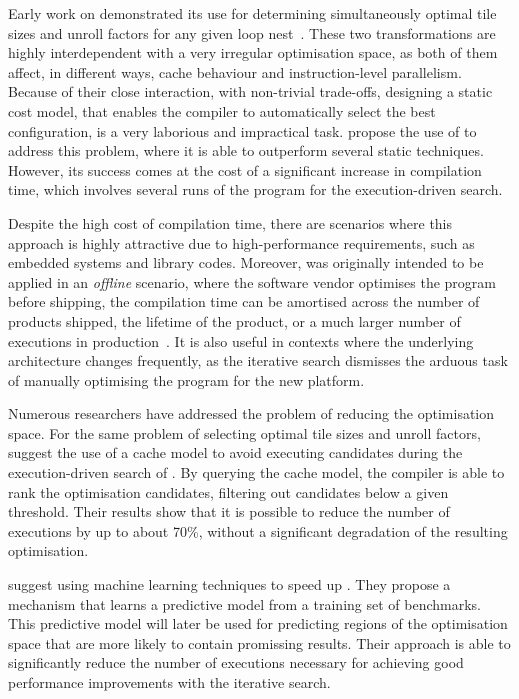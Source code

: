 Early work on {\itercomp} demonstrated its use for determining simultaneously optimal tile sizes and unroll factors for any given loop nest~\cite{kisuki00,knijnenburg04}.
These two transformations are highly interdependent with a very irregular optimisation space, as both of them affect, in different ways, cache behaviour and instruction-level parallelism.
Because of their close interaction, with non-trivial trade-offs, designing a static cost model, that enables the compiler to automatically select the best configuration, is a very laborious and impractical task.
\cite{kisuki00} propose the use of {\itercomp} to address this problem, where it is able to outperform several static techniques.
However, its success comes at the cost of a significant increase in compilation time, which involves several runs of the program for the execution-driven search.

Despite the high cost of compilation time, there are scenarios where this approach is highly attractive due to high-performance requirements, such as embedded systems and library codes.
Moreover, {\itercomp} was originally intended to be applied in an \textit{offline} scenario, where the software vendor optimises the program before shipping, the compilation time can be amortised across the number of products shipped, the lifetime of the product, or a much larger number of executions in production~\cite{kisuki99,kisuki00,chen10}.
It is also useful in contexts where the underlying architecture changes frequently, as the iterative search dismisses the arduous task of manually optimising the program for the new platform.

Numerous researchers have addressed the problem of reducing the optimisation space.
For the same problem of selecting optimal tile sizes and unroll factors, \cite{knijnenburg04} suggest the use of a cache model to avoid executing candidates during the execution-driven search of {\itercomp}.
By querying the cache model, the compiler is able to rank the optimisation candidates, filtering out candidates below a given threshold.
Their results show that it is possible to reduce the number of executions by up to about 70\%, without a significant degradation of the resulting optimisation.

\cite{agakov06} suggest using machine learning techniques to speed up {\itercomp}.
They propose a mechanism that learns a predictive model from a training set of benchmarks.
This predictive model will later be used for predicting regions of the optimisation space that are more likely to contain promissing results.
Their approach is able to significantly reduce the number of executions necessary for achieving good performance improvements with the iterative search.

